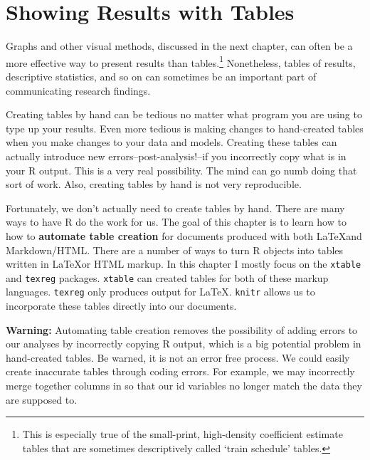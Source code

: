 



\chapter{Showing Results with Tables}\label{TablesChapter}

Graphs and other visual methods, discussed in the next chapter, can often be a more effective way to present results than tables.\footnote{This is especially true of the small-print, high-density coefficient estimate tables that are sometimes descriptively called `train schedule' tables.} Nonetheless, tables of results, descriptive statistics, and so on can sometimes be an important part of communicating research findings.

Creating tables by hand can be tedious no matter what program you are
using to type up your results. Even more tedious is making changes to
hand-created tables when you make changes to your data and models.
Creating these tables can actually introduce new
errors--post-analysis!--if you incorrectly copy what is in your
R output. This is a very real possibility. The mind can go numb
doing that sort of work. Also, creating tables by hand is not very
reproducible.

Fortunately, we don't actually need to create tables by hand. There are
many ways to have R do the work for us. The goal of this
chapter is to learn how to how to \textbf{automate table creation} for
documents produced with both \LaTeX and Markdown/HTML. There are a
number of ways to turn R objects into tables written in
\LaTeX or HTML markup. In this chapter I mostly focus on the
\texttt{xtable} and \texttt{texreg} packages. \texttt{xtable} can
created tables for both of these markup languages. \texttt{texreg} only
produces output for \LaTeX. \texttt{knitr} allows us to incorporate
these tables directly into our documents.

\textbf{Warning:} Automating table creation removes the possibility of
adding errors to our analyses by incorrectly copying R output,
which is a big potential problem in hand-created tables. Be warned, it
is not an error free process. We could easily create inaccurate tables
through coding errors. For example, we may incorrectly merge together
columns in so that our id variables no longer match the data they are
supposed to.

